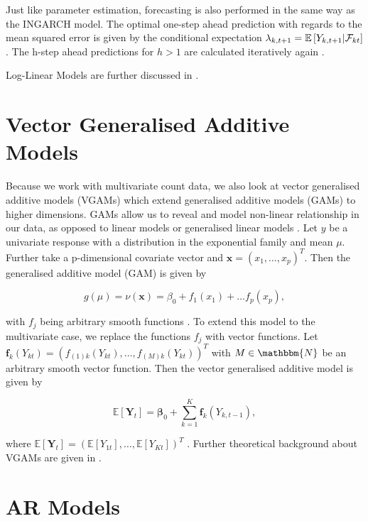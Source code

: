 Just like parameter estimation, forecasting is also performed in the same way as the INGARCH model. The optimal one-step ahead prediction with regards to the mean squared error is given by the conditional expectation $\lambda_{k,t+1}=\mathbb{E}\left[Y_{k,t+1} | \mathcal{F}_{kt} \right]$. The h-step ahead predictions for $h>1$ are calculated iteratively again \cite{Liboschik:2016}. 

Log-Linear Models are further discussed in \cite{Fokianos:2011,Woodard:2011,Douc:2013}.


\section{Vector Generalised Additive Models}
\label{sec:Vgam}

Because we work with multivariate count data, we also look at vector generalised additive models (VGAMs) which extend generalised additive models (GAMs) to higher dimensions. GAMs allow us to reveal and model non-linear relationship in our data, as opposed to linear models or generalised linear models \cite{Yee:1996}. Let $y$ be a univariate response with a distribution in the exponential family and mean $\mu$. Further take a p-dimensional covariate vector and $\bm{x}=(x_1,\ldots,x_p)^T$. Then the generalised additive model (GAM) is given by

\begin{equation}
g(\mu) = \nu(\bm{x}) = \beta_0 + f_1(x_1) + \ldots f_p(x_p),
\label{eq:Gam}
\end{equation}

with $f_j$ being arbitrary smooth functions \cite{Yee:1996}.
To extend this model to the multivariate case, we replace the functions $f_j$ with vector functions. Let $\bm{f}_k(Y_{kt}) = (f_{(1)k}(Y_{kt}),\ldots,f_{(M)k}(Y_{kt}))^T$ with $M \in \mathbbm{N}$ be an arbitrary smooth vector function. Then the vector generalised additive model is given by

\begin{equation}
\mathbb{E}[\bm{Y}_t] = \bm{\beta}_0 + \sum_{k=1}^K\bm{f}_k(Y_{k,t-1}),
\label{eq:Vgam}
\end{equation}

where $\mathbb{E}[\bm{Y}_t] = (\mathbb{E}[Y_{1t}],\ldots,\mathbb{E}[Y_{Kt}])^T$ \cite{Yee:1996}. Further theoretical background about VGAMs are given in \cite{Yee:1996,Yee:2015,Wood:2004}.

\section{AR Models}
\label{sec: Ar Models}

